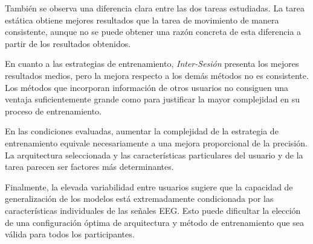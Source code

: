También se observa una diferencia clara entre las dos tareas estudiadas. La tarea estática obtiene mejores resultados que la tarea de movimiento de manera consistente, aunque no se puede obtener una razón concreta de esta diferencia a partir de los resultados obtenidos.

En cuanto a las estrategias de entrenamiento, \textit{Inter-Sesión} presenta los mejores resultados medios, pero la mejora respecto a los demás métodos no es consistente. Los métodos que incorporan información de otros usuarios no consiguen una ventaja suficientemente grande como para justificar la mayor complejidad en su proceso de entrenamiento.

En las condiciones evaluadas, aumentar la complejidad de la estrategia de entrenamiento equivale necesariamente a una mejora proporcional de la precisión. La arquitectura seleccionada y las características particulares del usuario y de la tarea parecen ser factores más determinantes.

Finalmente, la elevada variabilidad entre usuarios sugiere que la capacidad de generalización de los modelos está extremadamente condicionada por las características individuales de las señales EEG. Esto puede dificultar la elección de una configuración óptima de arquitectura y método de entrenamiento que sea válida para todos los participantes.

